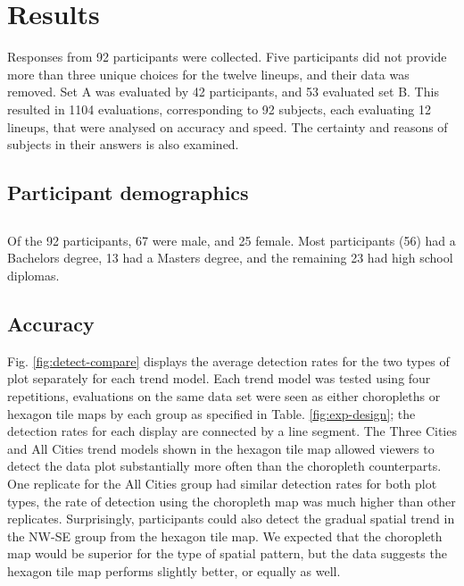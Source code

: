 \documentclass[12pt]{article}
\begin{document}
\section{Results}
\label{sec:res}

Responses from 92 participants were collected. Five participants did not
provide more than three unique choices for the twelve lineups, and their
data was removed. Set A was evaluated by 42 participants, and 53
evaluated set B. This resulted in 1104 evaluations, corresponding to 92
subjects, each evaluating 12 lineups, that were analysed on accuracy and
speed. The certainty and reasons of subjects in their answers is also
examined.

\subsection{Participant demographics}
\label{sec:pd}

\hypertarget{section}{%
\subsection{}\label{section}}

Of the 92 participants, 67 were male, and 25 female. Most participants
(56) had a Bachelors degree, 13 had a Masters degree, and the remaining
23 had high school diplomas.

\subsection{Accuracy}
\label{sec:acc}

Fig. \ref{fig:detect-compare} displays the average detection rates for
the two types of plot separately for each trend model. Each trend model
was tested using four repetitions, evaluations on the same data set were
seen as either choropleths or hexagon tile maps by each group as
specified in Table. \ref{fig:exp-design}; the detection rates for each
display are connected by a line segment. The Three Cities and All Cities
trend models shown in the hexagon tile map allowed viewers to detect the
data plot substantially more often than the choropleth counterparts. One
replicate for the All Cities group had similar detection rates for both
plot types, the rate of detection using the choropleth map was much
higher than other replicates. Surprisingly, participants could also
detect the gradual spatial trend in the NW-SE group from the hexagon
tile map. We expected that the choropleth map would be superior for the
type of spatial pattern, but the data suggests the hexagon tile map
performs slightly better, or equally as well.
\end{document}
